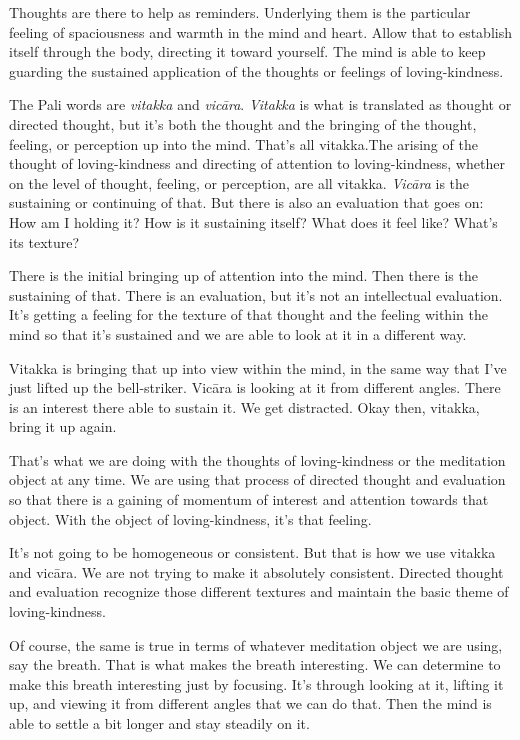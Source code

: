 Thoughts are there to help as reminders. Underlying them is the
particular feeling of spaciousness and warmth in the mind and heart.
Allow that to establish itself through the body, directing it toward
yourself. The mind is able to keep guarding the sustained application of
the thoughts or feelings of loving-kindness.

The Pali words are \emph{vitakka} and \emph{vicāra}. \emph{Vitakka} is
what is translated as thought or directed thought, but it’s both the
thought and the bringing of the thought, feeling, or perception up into
the mind. That's all vitakka.The arising of the thought of
loving-kindness and directing of attention to loving-kindness, whether
on the level of thought, feeling, or perception, are all vitakka.
\emph{Vicāra} is the sustaining or continuing of that. But there is also
an evaluation that goes on: How am I holding it? How is it sustaining
itself? What does it feel like? What’s its texture?

There is the initial bringing up of attention into the mind. Then there
is the sustaining of that. There is an evaluation, but it’s not an
intellectual evaluation. It’s getting a feeling for the texture of that
thought and the feeling within the mind so that it’s sustained and we
are able to look at it in a different way.

Vitakka is bringing that up into view within the mind, in the same way
that I’ve just lifted up the bell-striker. Vicāra is looking at it from
different angles. There is an interest there able to sustain it. We get
distracted. Okay then, vitakka, bring it up again.

That’s what we are doing with the thoughts of loving-kindness or the
meditation object at any time. We are using that process of directed
thought and evaluation so that there is a gaining of momentum of
interest and attention towards that object. With the object of
loving-kindness, it’s that feeling.

It’s not going to be homogeneous or consistent. But that is how we use
vitakka and vicāra. We are not trying to make it absolutely consistent.
Directed thought and evaluation recognize those different textures and
maintain the basic theme of loving-kindness.

Of course, the same is true in terms of whatever meditation object we
are using, say the breath. That is what makes the breath interesting. We
can determine to make this breath interesting just by focusing. It’s
through looking at it, lifting it up, and viewing it from different
angles that we can do that. Then the mind is able to settle a bit longer
and stay steadily on it.

